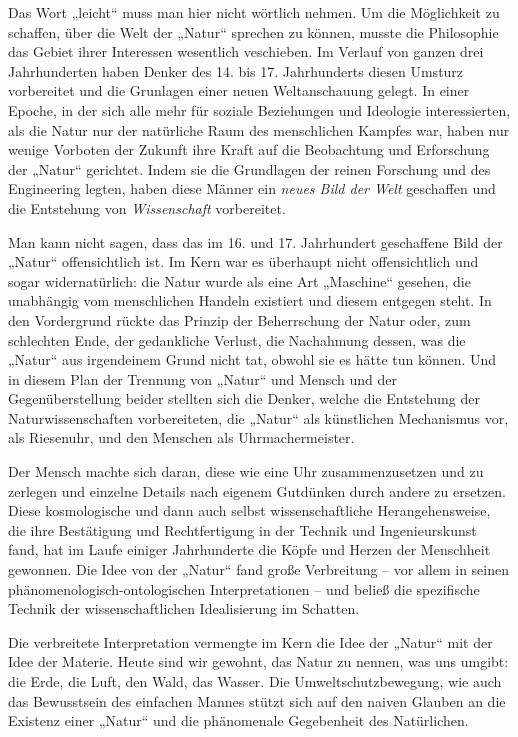 \documentclass[11pt,a4paper]{article}
\begin{document}
Das Wort „leicht“ muss man hier nicht wörtlich nehmen. Um die Möglichkeit zu
schaffen, über die Welt der „Natur“ sprechen zu können, musste die Philosophie
das Gebiet ihrer Interessen wesentlich veschieben. Im Verlauf von ganzen drei
Jahrhunderten haben Denker des 14. bis 17. Jahrhunderts diesen Umsturz
vorbereitet und die Grunlagen einer neuen Weltanschauung gelegt. In einer
Epoche, in der sich alle mehr für soziale Beziehungen und Ideologie
interessierten, als die Natur nur der natürliche Raum des menschlichen Kampfes
war, haben nur wenige Vorboten der Zukunft ihre Kraft auf die Beobachtung und
Erforschung der „Natur“ gerichtet. Indem sie die Grundlagen der reinen
Forschung und des Engineering legten, haben diese Männer ein \emph{neues Bild
  der Welt} geschaffen und die Entstehung von \emph{Wissenschaft} vorbereitet.

Man kann nicht sagen, dass das im 16. und 17. Jahrhundert geschaffene Bild der
„Natur“ offensichtlich ist. Im Kern war es überhaupt nicht offensichtlich und
sogar widernatürlich: die Natur wurde als eine Art „Maschine“ gesehen, die
unabhängig vom menschlichen Handeln existiert und diesem entgegen steht. In
den Vordergrund rückte das Prinzip der Beherrschung der Natur oder, zum
schlechten Ende, der gedankliche Verlust, die Nachahmung dessen, was die
„Natur“ aus irgendeinem Grund nicht tat, obwohl sie es hätte tun können. Und
in diesem Plan der Trennung von „Natur“ und Mensch und der Gegenüberstellung
beider stellten sich die Denker, welche die Entstehung der Naturwissenschaften
vorbereiteten, die „Natur“ als künstlichen Mechanismus vor, als Riesenuhr, und
den Menschen als Uhrmachermeister.

Der Mensch machte sich daran, diese wie eine Uhr zusammenzusetzen und zu
zerlegen und einzelne Details nach eigenem Gutdünken durch andere zu ersetzen.
Diese kosmologische und dann auch selbst wissenschaftliche Herangehensweise,
die ihre Bestätigung und Rechtfertigung in der Technik und Ingenieurskunst
fand, hat im Laufe einiger Jahrhunderte die Köpfe und Herzen der Menschheit
gewonnen. Die Idee von der „Natur“ fand große Verbreitung -- vor allem in
seinen phänomenologisch-ontologischen Interpretationen -- und beließ die
spezifische Technik der wissenschaftlichen Idealisierung im Schatten.

Die verbreitete Interpretation vermengte im Kern die Idee der „Natur“ mit der
Idee der Materie. Heute sind wir gewohnt, das Natur zu nennen, was uns umgibt:
die Erde, die Luft, den Wald, das Wasser. Die Umweltschutzbewegung, wie auch
das Bewusstsein des einfachen Mannes stützt sich auf den naiven Glauben an die
Existenz einer „Natur“ und die phänomenale Gegebenheit des Natürlichen.
\end{document}
